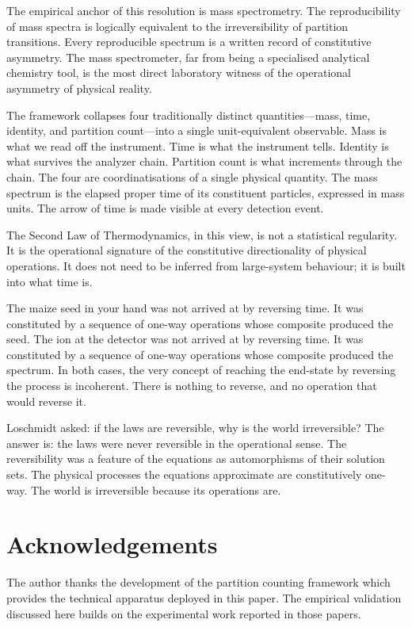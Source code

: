 \documentclass[twocolumn,10pt,a4paper]{article}
\theoremstyle{definition}
\theoremstyle{remark}
\begin{document}
The empirical anchor of this resolution is mass spectrometry. The reproducibility of mass spectra is logically equivalent to the irreversibility of partition transitions. Every reproducible spectrum is a written record of constitutive asymmetry. The mass spectrometer, far from being a specialised analytical chemistry tool, is the most direct laboratory witness of the operational asymmetry of physical reality.

The framework collapses four traditionally distinct quantities---mass, time, identity, and partition count---into a single unit-equivalent observable. Mass is what we read off the instrument. Time is what the instrument tells. Identity is what survives the analyzer chain. Partition count is what increments through the chain. The four are coordinatisations of a single physical quantity. The mass spectrum is the elapsed proper time of its constituent particles, expressed in mass units. The arrow of time is made visible at every detection event.

The Second Law of Thermodynamics, in this view, is not a statistical regularity. It is the operational signature of the constitutive directionality of physical operations. It does not need to be inferred from large-system behaviour; it is built into what time is.

The maize seed in your hand was not arrived at by reversing time. It was constituted by a sequence of one-way operations whose composite produced the seed. The ion at the detector was not arrived at by reversing time. It was constituted by a sequence of one-way operations whose composite produced the spectrum. In both cases, the very concept of reaching the end-state by reversing the process is incoherent. There is nothing to reverse, and no operation that would reverse it.

Loschmidt asked: if the laws are reversible, why is the world irreversible? The answer is: the laws were never reversible in the operational sense. The reversibility was a feature of the equations as automorphisms of their solution sets. The physical processes the equations approximate are constitutively one-way. The world is irreversible because its operations are.

\section*{Acknowledgements}

The author thanks the development of the partition counting framework \citep{sachikonye2025loschmidt,sachikonye2025partition,sachikonye2025counting,sachikonye2025temporal} which provides the technical apparatus deployed in this paper. The empirical validation discussed here builds on the experimental work reported in those papers.



\end{document}

